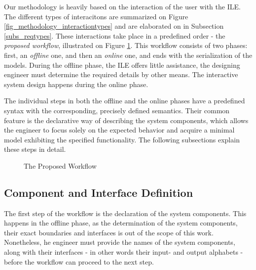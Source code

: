 Our methodology is heavily based on the interaction of the user with the ILE. The different types of interacitons are summarized on Figure \ref{fig_methodology_interactiontypes} and are elaborated on in Subsection \ref{subs_reqtypes}. These interactions take place in a predefined order - the \textit{proposed workflow}, illustrated on Figure \ref{fig_methodology_workflow}. This workflow consists of two phases: first, an \textit{offline} one, and then an \textit{online} one, and ends with the serialization of the models. During the offline phase, the ILE offers little assistance, the designing engineer must determine the required details by other means. The interactive system design happens during the online phase. 

The individual steps in both the offline and the online phases have a predefined syntax with the corresponding, precisely defined semantics. Their common feature is the declarative way of describing the system components, which allows the engineer to focus solely on the expected behavior and acquire a minimal model exhibiting the specified functionality. The following subsections explain these steps in detail.

\begin{figure}[!ht] 
	\centering
	\caption{The Proposed Workflow}
	\label{fig_methodology_workflow}
\end{figure}

\subsection{Component and Interface Definition} \label{subs_compdef}
The first step of the workflow is the declaration of the system components. This happens in the offline phase, as the determination of the system components, their exact boundaries and interfaces is out of the scope of this work. Nonetheless, he engineer must provide the names of the system components, along with their interfaces - in other words their input- and output alphabets - before the workflow can proceed to the next step.

